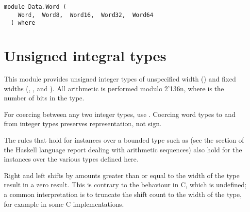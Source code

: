 \label{module:Data.Word}
\haddockbeginheader
{\haddockverb\begin{verbatim}
module Data.Word (
    Word,  Word8,  Word16,  Word32,  Word64
  ) where\end{verbatim}}
\haddockendheader

\section{Unsigned integral types
}
This module provides unsigned integer types of unspecified width ()
and fixed widths (, ,  and ).  All
arithmetic is performed modulo 2{\char '136}n, where  is the number of bits in
the type.
\par
For coercing between any two integer types, use
.  Coercing word types to and from integer
types preserves representation, not sign.
\par
The rules that hold for  instances over a bounded type
such as  (see the section of the Haskell language report dealing
with arithmetic sequences) also hold for the  instances
over the various  types defined here.
\par
Right and left shifts by amounts greater than or equal to the width of
the type result in a zero result.  This is contrary to the behaviour
in C, which is undefined; a common interpretation is to truncate the
shift count to the width of the type, for example  in
some C implementations.
\par

